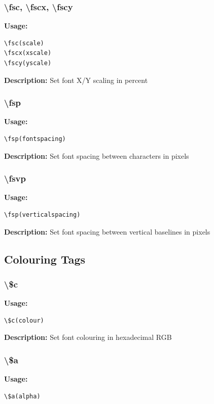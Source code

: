 \documentclass{spec}
\begin{document}
\subsubsection{\textbackslash fsc, \textbackslash fscx, \textbackslash fscy}
\textbf{Usage:}
\begin{verbatim}
\fsc(scale)
\fscx(xscale)
\fscy(yscale)
\end{verbatim}

\textbf{Description:}
Set font X/Y scaling in percent

\subsubsection{\textbackslash fsp}
\textbf{Usage:}
\begin{verbatim}
\fsp(fontspacing)
\end{verbatim}

\textbf{Description:}
Set font spacing between characters in pixels

\subsubsection{\textbackslash fsvp}
\textbf{Usage:}
\begin{verbatim}
\fsp(verticalspacing)
\end{verbatim}

\textbf{Description:}
Set font spacing between vertical baselines in pixels

\subsection{Colouring Tags}

\subsubsection{\textbackslash \$c}
\textbf{Usage:}
\begin{verbatim}
\$c(colour)
\end{verbatim}

\textbf{Description:}
Set font colouring in hexadecimal RGB

\subsubsection{\textbackslash \$a}
\textbf{Usage:}
\begin{verbatim}
\$a(alpha)
\end{verbatim}
\end{document}
